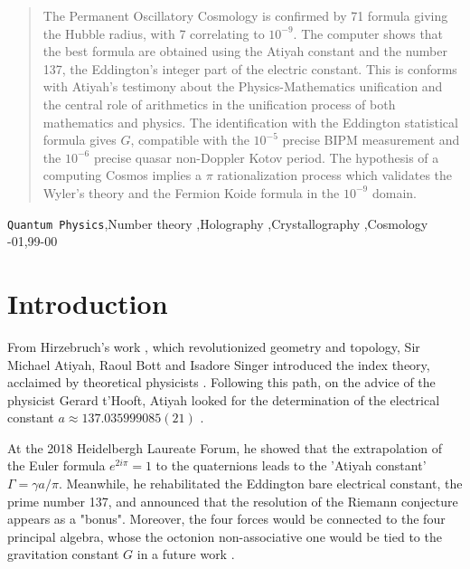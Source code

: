 \documentclass[preprint,12pt]{elsarticle}
\begin{document}
\begin{frontmatter}

\author[mysecondaryaddress]{Francis M.Sanchez}

\address[mymainaddress]{Universite Paris Sud Orsay}


\begin{abstract}
The Permanent Oscillatory Cosmology is confirmed by 71 formula giving the Hubble radius, with 7 correlating to $10^{-9}$. The computer shows that the best formula are obtained using the Atiyah constant and the number 137, the Eddington's integer part of the electric constant. This is conforms with Atiyah's testimony about the Physics-Mathematics unification and the central role of arithmetics in the unification process of both mathematics and physics. The identification with the Eddington statistical formula gives $G$, compatible with the $10^{-5}$ precise BIPM measurement and the $10^{-6}$ precise quasar non-Doppler Kotov period. The hypothesis of a computing Cosmos implies a $\pi$ rationalization process which validates the Wyler's theory and the Fermion Koide formula in the $10^{-9}$ domain. 
\end{abstract}

\begin{keyword}
\texttt{Quantum Physics}\sep Number theory \sep Holography \sep Crystallography \sep Cosmology
-01\sep  99-00
\end{keyword}


\end{frontmatter}


\section{Introduction}
  
    From Hirzebruch's work \cite{Hirzebruch}, which revolutionized geometry and topology, Sir Michael Atiyah, Raoul Bott \cite{Bott} and Isadore Singer \cite{Singer} introduced the index theory, acclaimed by theoretical physicists \cite{Alvarez}. Following this path, on the advice of the physicist Gerard t'Hooft, Atiyah looked for the determination of the electrical constant $a \approx 137.035999085(21)$ \cite{Atiyah}.
    
    
    At the 2018 Heidelbergh Laureate Forum, he showed that the extrapolation of the Euler formula  $e^{2i\pi} = 1$ to the quaternions leads to the 'Atiyah constant' $\Gamma = \gamma a/\pi $. Meanwhile, he rehabilitated the Eddington \cite{Eddington} bare electrical constant, the prime number 137, and announced that the resolution of the Riemann conjecture appears as a "bonus". Moreover, the four forces would be connected to the four principal algebra, whose the octonion non-associative one would be tied to the gravitation constant $G$ in a future work \cite{Atiyah}. 
\end{document}
